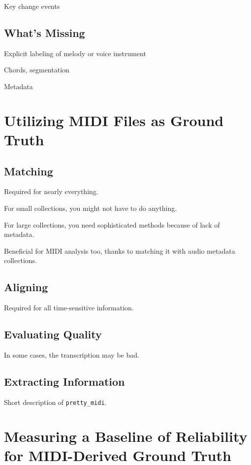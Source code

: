 \documentclass{article}
\begin{document}
Key change events

\subsection{What's Missing}

Explicit labeling of melody or voice instrument

Chords, segmentation

Metadata

\section{Utilizing MIDI Files as Ground Truth}
\label{sec:utilizing}

\subsection{Matching}

Required for nearly everything.

For small collections, you might not have to do anything.

For large collections, you need sophisticated methods because of lack of metadata.

Beneficial for MIDI analysis too, thanks to matching it with audio metadata collections.

\subsection{Aligning}

Required for all time-sensitive information.

\subsection{Evaluating Quality}

In some cases, the transcription may be bad.

\subsection{Extracting Information}

Short description of \texttt{pretty\_midi}.

\section{Measuring a Baseline of Reliability for MIDI-Derived Ground Truth}
\label{sec:measuring}
\end{document}
